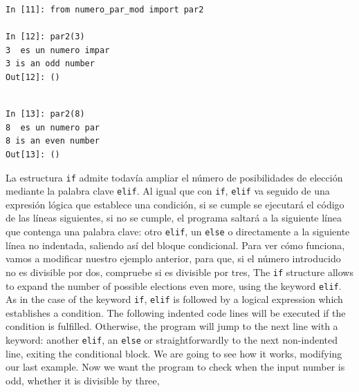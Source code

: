 \begin{center}
    \begin{minipage}{.5\textwidth}
\begin{verbatim}
In [11]: from numero_par_mod import par2

In [12]: par2(3)
3  es un numero impar
3 is an odd number
Out[12]: ()
\end{verbatim}
\end{minipage}
\end{center}
\begin{center}
	\begin{minipage}{.5\textwidth}
		\begin{verbatim}

In [13]: par2(8)
8  es un numero par
8 is an even number
Out[13]: ()
\end{verbatim}
\end{minipage}
\end{center}
    
\begin{paracol}{2}
La estructura \texttt{if} admite todavía ampliar el número de posibilidades de elección mediante la palabra clave \texttt{elif}. Al igual que  con \texttt{if}, \texttt{elif} va seguido de una expresión lógica que establece una condición, si se cumple se ejecutará el código de las líneas siguientes, si no se cumple, el programa saltará a la siguiente línea que contenga una palabra clave: otro \texttt{elif}, un \texttt{else} o directamente a la siguiente línea no indentada, saliendo así del bloque condicional. Para ver cómo funciona, vamos a modificar nuestro ejemplo anterior, para que, si el número introducido no es divisible por dos, compruebe si es divisible por tres,
\switchcolumn
The \texttt{if} structure allows to expand the number of possible elections even more, using the keyword \texttt{elif}. As in the case of the keyword \texttt{if}, \texttt{elif} is followed by a logical expression which establishes a condition. The following indented code lines will be executed if the condition is fulfilled. Otherwise, the program will jump to the next line with a keyword: another \texttt{elif}, an \texttt{else} or straightforwardly to the next non-indented line, exiting the conditional block. We are going to see how it works, modifying our last example. Now we want the program to check when the input number is odd, whether it is divisible by three, 
\end{paracol}

